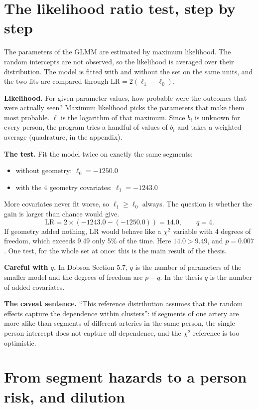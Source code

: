 \documentclass[11pt]{article}
\begin{document}
\section{The likelihood ratio test, step by step}

\begin{thesisline}
The parameters of the GLMM are estimated by maximum likelihood. The random intercepts are not
observed, so the likelihood is averaged over their distribution. The model is fitted with and
without the set on the same units, and the two fits are compared through
$\mathrm{LR} = 2(\ell_1 - \ell_0)$.
\end{thesisline}

\textbf{Likelihood.} For given parameter values, how probable were the outcomes that were actually
seen? Maximum likelihood picks the parameters that make them most probable. $\ell$ is the logarithm
of that maximum. Since $b_i$ is unknown for every person, the program tries a handful of values of
$b_i$ and takes a weighted average (quadrature, in the appendix).

\textbf{The test.} Fit the model twice on exactly the same segments:
\begin{itemize}
  \item without geometry: $\ell_0 = -1250.0$
  \item with the 4 geometry covariates: $\ell_1 = -1243.0$
\end{itemize}
More covariates never fit worse, so $\ell_1 \geq \ell_0$ always. The question is whether the gain is
larger than chance would give.
\[
  \mathrm{LR} = 2 \times (-1243.0 - (-1250.0)) = 14.0, \qquad q = 4 .
\]
If geometry added nothing, LR would behave like a $\chi^2$ variable with 4 degrees of freedom, which
exceeds 9.49 only 5\% of the time. Here $14.0 > 9.49$, and $p = 0.007$. One test, for the whole set
at once: this is the main result of the thesis.

\textbf{Careful with $q$.} In Dobson Section 5.7, $q$ is the number of parameters of the smaller
model and the degrees of freedom are $p - q$. In the thesis $q$ is the number of added covariates.

\textbf{The caveat sentence.} ``This reference distribution assumes that the random effects capture
the dependence within clusters'': if segments of one artery are more alike than segments of
different arteries in the same person, the single person intercept does not capture all dependence,
and the $\chi^2$ reference is too optimistic.

\section{From segment hazards to a person risk, and dilution}
\end{document}
